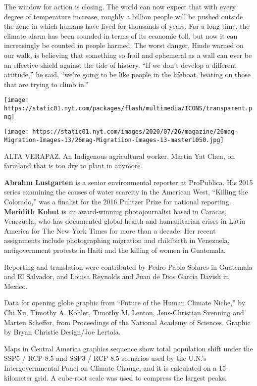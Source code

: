 The window for action is closing. The world can now expect that with
every degree of temperature increase, roughly a billion people will be
pushed outside the zone in which humans have lived for thousands of
years. For a long time, the climate alarm has been sounded in terms of
its economic toll, but now it can increasingly be counted in people
harmed. The worst danger, Hinde warned on our walk, is believing that
something so frail and ephemeral as a wall can ever be an effective
shield against the tide of history. ``If we don't develop a different
attitude,'' he said, ``we're going to be like people in the lifeboat,
beating on those that are trying to climb in.''

\texttt{[image: https://static01.nyt.com/packages/flash/multimedia/ICONS/transparent.png]}

\texttt{[image: https://static01.nyt.com/images/2020/07/26/magazine/26mag-Migration-Images-13/26mag-Migratiion-Images-13-master1050.jpg]}

ALTA VERAPAZ. An Indigenous agricultural worker, Martin Yat Chen, on
farmland that is too dry to plant in anymore.

\textbf{Abrahm Lustgarten} is a senior environmental reporter at
ProPublica. His 2015 series examining the causes of water scarcity in
the American West, ``Killing the Colorado,'' was a finalist for the 2016
Pulitzer Prize for national reporting. \textbf{Meridith Kohut} is an
award-winning photojournalist based in Caracas, Venezuela, who has
documented global health and humanitarian crises in Latin America for
The New York Times for more than a decade. Her recent assignments
include photographing migration and childbirth in Venezuela,
antigovernment protests in Haiti and the killing of women in Guatemala.

Reporting and translation were contributed by Pedro Pablo Solares in
Guatemala and El Salvador, and Louisa Reynolds and Juan de Dios García
Davish in Mexico.

Data for opening globe graphic from ``Future of the Human Climate
Niche,'' by Chi Xu, Timothy A. Kohler, Timothy M. Lenton, Jens-Christian
Svenning and Marten Scheffer, from Proceedings of the National Academy
of Sciences. Graphic by Bryan Christie Design/Joe Lertola.

Maps in Central America graphics sequence show total population shift
under the SSP5 / RCP 8.5 and SSP3 / RCP 8.5 scenarios used by the U.N.'s
Intergovernmental Panel on Climate Change, and it is calculated on a
15-kilometer grid. A cube-root scale was used to compress the largest
peaks.

